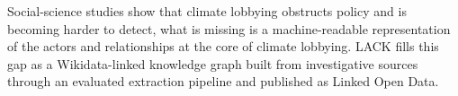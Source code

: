 Social-science studies show that climate lobbying obstructs policy and is becoming harder to detect, what is missing is a machine-readable representation of the actors and relationships at the core of climate lobbying. 
LACK fills this gap as a Wikidata-linked knowledge graph built from investigative sources through an evaluated extraction pipeline and published as Linked Open Data.

%

